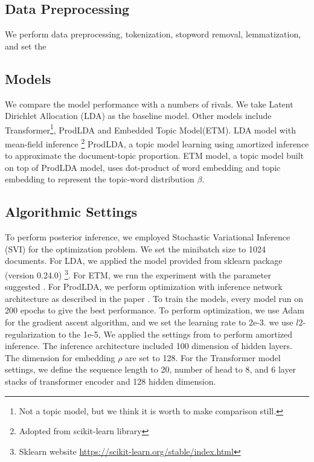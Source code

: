 \subsection{Data Preprocessing}
We perform data preprocessing, tokenization, stopword removal, lemmatization, and set the 
\subsection{Models}
We compare the model performance with a numbers of rivals. We take Latent Dirichlet Allocation (LDA)\cite{blei_latent_2003} as the baseline model. Other models include Transformer\cite{vaswani_attention_nodate}\footnote{Not a topic model, but we think it is worth to make comparison still.},  ProdLDA\cite{srivastava_autoencoding_2017} and Embedded Topic Model(ETM)\cite{dieng_topic_2019}.
LDA model with mean-field inference \footnote{Adopted from \textmd{scikit-learn} library}
ProdLDA, a topic model learning using amortized inference to approximate the document-topic proportion.
ETM model, a topic model built on top of ProdLDA model, uses dot-product of word embedding and topic embedding to represent the topic-word distribution $ \beta $.
\subsection{Algorithmic Settings}
To perform posterior inference, we employed Stochastic Variational Inference (SVI) \cite{hoffman_stochastic_2013} for the optimization problem. We set the minibatch size to 1024 documents.
For LDA, we applied the model provided from sklearn package (version 0.24.0) \footnote{Sklearn website \url{https://scikit-learn.org/stable/index.html}}. For ETM, we run the experiment with the parameter suggested \cite{dieng_topic_2019}. For ProdLDA, we perform optimization with inference network architecture as described in the paper \cite{srivastava_autoencoding_2017}. 
To train the models, every model run on 200 epochs to give the best performance. 
To perform optimization, we use Adam for the gradient ascent algorithm, and we set the learning rate to 2e-3.
we use $ l2 $-regularization to the 1e-5,
We applied the settings from \cite{srivastava_autoencoding_2017} to perform amortized inference. The inference architecture included 100 dimension of hidden layers. 
The dimension for embedding $ \rho $ are set to 128.
For the Transformer model settings, we define the sequence length to 20, number of head to 8, and 6 layer stacks of transformer encoder and 128 hidden dimension.
